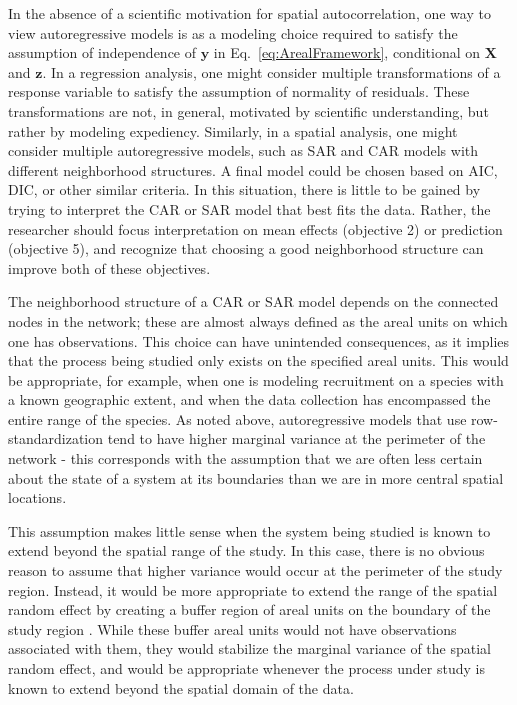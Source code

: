 In the absence of a scientific motivation for spatial autocorrelation, one way to view autoregressive models is as a modeling choice required to satisfy the assumption of independence of $\mathbf{y}$ in  Eq.~\ref{eq:ArealFramework}, conditional on $\mathbf{X}$ and $\mathbf{z}$.  In a regression analysis, one might consider multiple transformations of a response variable to satisfy the assumption of normality of residuals.  These transformations are not, in general, motivated by scientific understanding, but rather by modeling expediency.  Similarly, in a spatial analysis, one might consider multiple autoregressive models, such as SAR and CAR models with different neighborhood structures.  A final model could be chosen based on AIC, DIC, or other similar criteria.  In this situation, there is little to be gained by trying to interpret the CAR or SAR model that best fits the data.  Rather, the researcher should focus interpretation on mean effects (objective 2) or prediction (objective 5), and recognize that choosing a good neighborhood structure can improve both of these objectives.

The neighborhood structure of a CAR or SAR model depends on the connected nodes in the network; these are almost always defined as the areal units on which one has observations.  This choice can have unintended consequences, as it implies that the process being studied only exists on the specified areal units.  This would be appropriate, for example, when one is modeling recruitment on a species with a known geographic extent, and when the data collection has encompassed the entire range of the species.  As noted above, autoregressive models that use row-standardization tend to have higher marginal variance at the perimeter of the network - this corresponds with the assumption that we are often less certain about the state of a system at its boundaries than we are in more central spatial locations.

This assumption makes little sense when the system being studied is known to extend beyond the spatial range of the study.  In this case, there is no obvious reason to assume that higher variance would occur at the perimeter of the study region.  Instead, it would be more appropriate to extend the range of the spatial random effect by creating a buffer region of areal units on the boundary of the study region  \citep[e.g.,][]{Lind:Rue:Lind:expl:2011}.  While these buffer areal units would not have observations associated with them, they would stabilize the marginal variance of the spatial random effect, and would be appropriate whenever the process under study is known to extend beyond the spatial domain of the data.    


